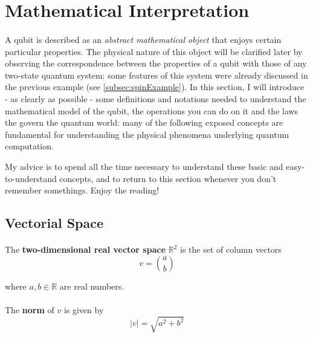 \documentclass[a4paper,10pt]{article}
\begin{document}
\section{Mathematical Interpretation}

\paragraph{} A qubit is described as an \textit{abstract mathematical object} that enjoys certain particular properties. The physical nature of this object will be clarified later by observing the correspondence between the properties of a qubit with those of any two-state quantum system: some features of this system were already discussed in the previous example (see \autoref{subsec:spinExample}). 
In this section, I will introduce - as clearly as possible - some definitions and notations needed to understand the mathematical model of the qubit, the operations you can do on it and the laws the govern the quantum world: many of the following exposed concepts are fundamental for understanding the physical phenomena underlying quantum computation. 

My advice is to spend all the time necessary to understand these basic and easy-to-understand concepts, and to return to this section whenever you don't remember somethings. Enjoy the reading!

\subsection{Vectorial Space}

\paragraph{} The \textbf{two-dimensional real vector space} ${\mathbb{R}}^2$ is the set of column vectors
\begin{equation}
v = \binom{a}{b}
\label{eq:vectorInR2}
\end{equation}

where $a, b \in \mathbb{R}$ are real numbers. 

\paragraph{} The \textbf{norm} of $v$ is given by
\begin{equation}
|v| = \sqrt{a^2 + b^2}
\label{eq:vectorNormInR2}
\end{equation}
\end{document}
